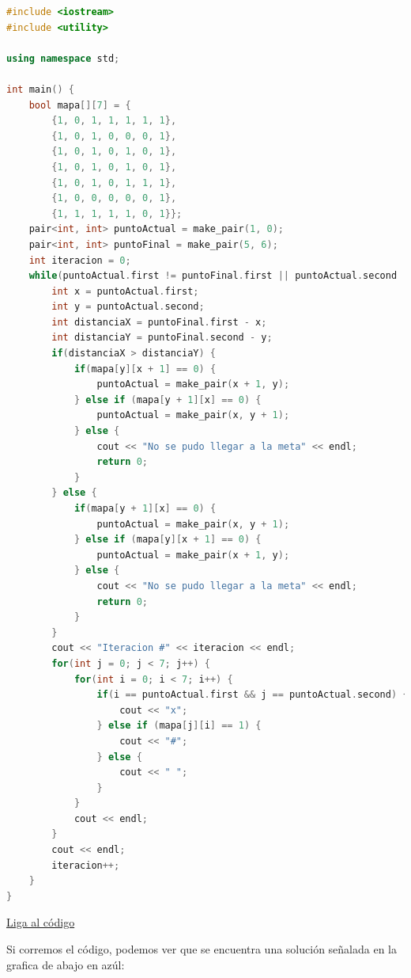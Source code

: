 \documentclass{article}
\begin{document}
\begin{lstlisting}[language=C++, caption=Camino greedy]
#include <iostream>
#include <utility>

using namespace std;

int main() {
    bool mapa[][7] = {
        {1, 0, 1, 1, 1, 1, 1},
        {1, 0, 1, 0, 0, 0, 1},
        {1, 0, 1, 0, 1, 0, 1},
        {1, 0, 1, 0, 1, 0, 1},
        {1, 0, 1, 0, 1, 1, 1},
        {1, 0, 0, 0, 0, 0, 1},
        {1, 1, 1, 1, 1, 0, 1}};
    pair<int, int> puntoActual = make_pair(1, 0);
    pair<int, int> puntoFinal = make_pair(5, 6);
    int iteracion = 0;
    while(puntoActual.first != puntoFinal.first || puntoActual.second != puntoFinal.second) {
        int x = puntoActual.first;
        int y = puntoActual.second;
        int distanciaX = puntoFinal.first - x;
        int distanciaY = puntoFinal.second - y;
        if(distanciaX > distanciaY) {
            if(mapa[y][x + 1] == 0) {
                puntoActual = make_pair(x + 1, y);
            } else if (mapa[y + 1][x] == 0) {
                puntoActual = make_pair(x, y + 1);
            } else {
                cout << "No se pudo llegar a la meta" << endl;
                return 0;
            }
        } else {
            if(mapa[y + 1][x] == 0) {
                puntoActual = make_pair(x, y + 1);
            } else if (mapa[y][x + 1] == 0) {
                puntoActual = make_pair(x + 1, y);
            } else {
                cout << "No se pudo llegar a la meta" << endl;
                return 0;
            }
        }
        cout << "Iteracion #" << iteracion << endl;
        for(int j = 0; j < 7; j++) {
            for(int i = 0; i < 7; i++) {
                if(i == puntoActual.first && j == puntoActual.second) {
                    cout << "x";
                } else if (mapa[j][i] == 1) {
                    cout << "#";
                } else {
                    cout << " ";
                }
            }
            cout << endl;
        }
        cout << endl;
        iteracion++;
    }
}
\end{lstlisting}
\href{https://repl.it/@Jamesscn/Algoritmos-Greedy}{Liga al código}

Si corremos el código, podemos ver que se encuentra una solución señalada en la grafica de abajo en azúl:
\end{document}
